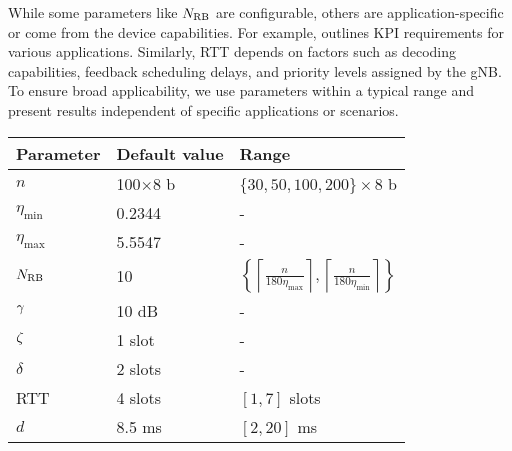 While some parameters like $N_{\mathrm{RB}}$ are configurable, others are application-specific or come from the device capabilities. For example, \cite{3gpp.22.261} outlines KPI requirements for various applications. Similarly, RTT depends on factors such as decoding capabilities, feedback scheduling delays, and priority levels assigned by the gNB.
To ensure broad applicability, we use parameters within a typical range and present results independent of specific applications or scenarios.
\begin{table}[t]
\centering
\renewcommand{\arraystretch}{1.25}
\begin{tabular}{|l|l|l|}
\hline
Parameter             & Default value  & Range                                                                                                                            \\ \hline
$n$                   & 100$\times$8 b & $\{30, 50, 100, 200\}\times8$ b                                                                                                  \\
$\eta_{\mathrm{min}}$ & 0.2344         & -                                                                                                                                \\
$\eta_{\mathrm{max}}$ & 5.5547         & -                                                                                                                                \\
$N_{\mathrm{RB}}$                & 10             & $\left\{\left\lceil\frac{n}{180\eta_{\mathrm{max}}}\right\rceil,\left\lceil\frac{n}{180\eta_{\mathrm{min}}}\right\rceil\right\}$ \\
$\gamma$                & 10 dB          & -                                                                                                              \\
${\zeta}$             & 1 slot         & -                                                                                                                                \\
$\delta$              & 2 slots        & -                                                                                                                                \\
RTT                   & 4 slots        & $[1,7]$ slots                                                                                                                    \\
$d$                   & 8.5 ms         & $[2, 20]$ ms                                                                                                                     \\

\end{tabular}
\end{table}

